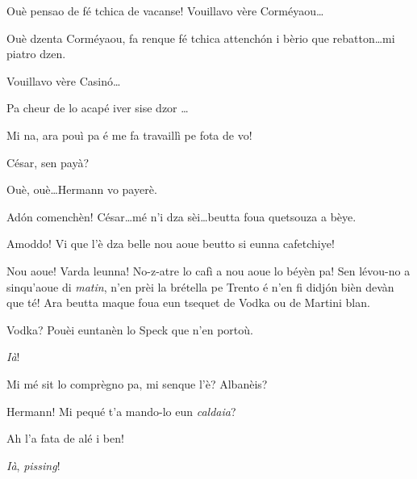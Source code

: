 \begin{drama}
\Peterspeaks{}  Ouè pensao de fé tchica de vacanse! Vouillavo vère Corméyaou\ldots

\Cesarspeaks Ouè dzenta Corméyaou, fa renque fé tchica attench\'on i bèrio que rebatton\ldots mi piatro dzen.

\Peterspeaks Vouillavo vère Casin\'o\ldots

\Cesarspeaks Pa cheur de lo acapé iver sise dzor \ldots

\Peterspeaks Mi na, ara pouì pa é me fa travaillì pe fota de vo!


\Katrinspeaks César, sen payà?

\Cesarspeaks{} Ouè, ouè\ldots Hermann vo payerè.


\Hermannspeaks Ad\'on comenchèn! César\ldots mé n'i dza sèi\ldots beutta foua quetsouza a bèye.

\Cesarspeaks Amoddo! Vi que l'è dza belle nou aoue beutto si eunna cafetchiye!

\Hermannspeaks{} Nou aoue! Varda leunna! No-z-atre lo cafì a nou aoue lo béyèn pa! Sen lévou-no a sinqu'aoue di \textit{matin}, n'en prèi la brétella pe Trento é n'en fi didj\'on bièn devàn que té! Ara beutta maque foua eun tsequet de Vodka ou de Martini blan.

\Peterspeaks {} Vodka? Pouèi euntanèn lo Speck que n'en portoù.

\Hermannspeaks \textit{Ià}!


\Cesarspeaks{} Mi mé sit lo comprègno pa, mi senque l'è? Albanèis?


\Cesarspeaks Hermann! Mi pequé t'a mando-lo eun \textit{caldaia}?


\Cesarspeaks Ah l'a fata de alé i ben!

\Hermannspeaks \textit{Ià}, \textit{pissing}!


\end{drama}
